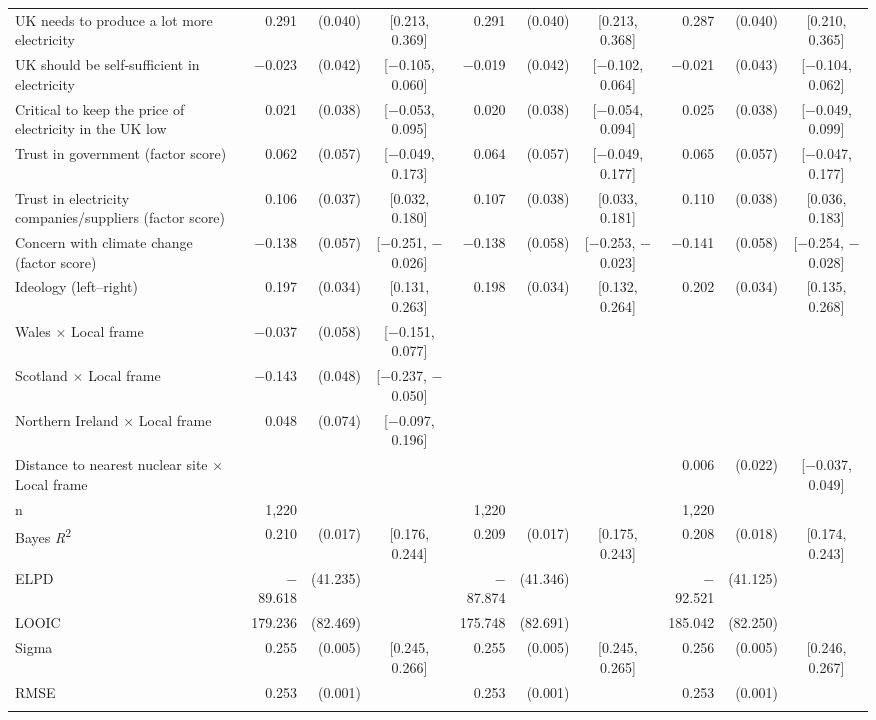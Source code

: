 \begin{landscape}
\begin{longtable}[t]{>{\raggedright\arraybackslash}p{2.8in}rrcrrcrrc}
UK needs to produce a lot more electricity & 0.291 & (0.040) & {}[0.213, 0.369] & 0.291 & (0.040) & {}[0.213, 0.368] & 0.287 & (0.040) & {}[0.210, 0.365]\\
UK should be self-sufficient in electricity & $-$0.023 & (0.042) & {}[$-$0.105, 0.060] & $-$0.019 & (0.042) & {}[$-$0.102, 0.064] & $-$0.021 & (0.043) & {}[$-$0.104, 0.062]\\
Critical to keep the price of electricity in the UK low & 0.021 & (0.038) & {}[$-$0.053, 0.095] & 0.020 & (0.038) & {}[$-$0.054, 0.094] & 0.025 & (0.038) & {}[$-$0.049, 0.099]\\
Trust in government (factor score) & 0.062 & (0.057) & {}[$-$0.049, 0.173] & 0.064 & (0.057) & {}[$-$0.049, 0.177] & 0.065 & (0.057) & {}[$-$0.047, 0.177]\\
Trust in electricity companies/suppliers (factor score) & 0.106 & (0.037) & {}[0.032, 0.180] & 0.107 & (0.038) & {}[0.033, 0.181] & 0.110 & (0.038) & {}[0.036, 0.183]\\
Concern with climate change (factor score) & $-$0.138 & (0.057) & {}[$-$0.251, $-$0.026] & $-$0.138 & (0.058) & {}[$-$0.253, $-$0.023] & $-$0.141 & (0.058) & {}[$-$0.254, $-$0.028]\\
Ideology (left--right) & 0.197 & (0.034) & {}[0.131, 0.263] & 0.198 & (0.034) & {}[0.132, 0.264] & 0.202 & (0.034) & {}[0.135, 0.268]\\
Wales $\times$ Local frame & $-$0.037 & (0.058) & {}[$-$0.151, 0.077] &  &  &  &  &  & \\
Scotland $\times$ Local frame & $-$0.143 & (0.048) & {}[$-$0.237, $-$0.050] &  &  &  &  &  & \\
Northern Ireland $\times$ Local frame & 0.048 & (0.074) & {}[$-$0.097, 0.196] &  &  &  &  &  & \\
Distance to nearest nuclear site $\times$ Local frame &  &  &  &  &  &  & 0.006 & (0.022) & {}[$-$0.037, 0.049]\\
\midrule
n & 1,220 &  &  & 1,220 &  &  & 1,220 &  & \\
Bayes \textit{R}\textsuperscript{2} & 0.210 & (0.017) & {}[0.176, 0.244] & 0.209 & (0.017) & {}[0.175, 0.243] & 0.208 & (0.018) & {}[0.174, 0.243]\\
ELPD & $-$89.618 & (41.235) &  & $-$87.874 & (41.346) &  & $-$92.521 & (41.125) & \\
LOOIC & 179.236 & (82.469) &  & 175.748 & (82.691) &  & 185.042 & (82.250) & \\
Sigma & 0.255 & (0.005) & {}[0.245, 0.266] & 0.255 & (0.005) & {}[0.245, 0.265] & 0.256 & (0.005) & {}[0.246, 0.267]\\
RMSE & 0.253 & (0.001) &  & 0.253 & (0.001) &  & 0.253 & (0.001) & \\*
\end{longtable}


\end{landscape}
